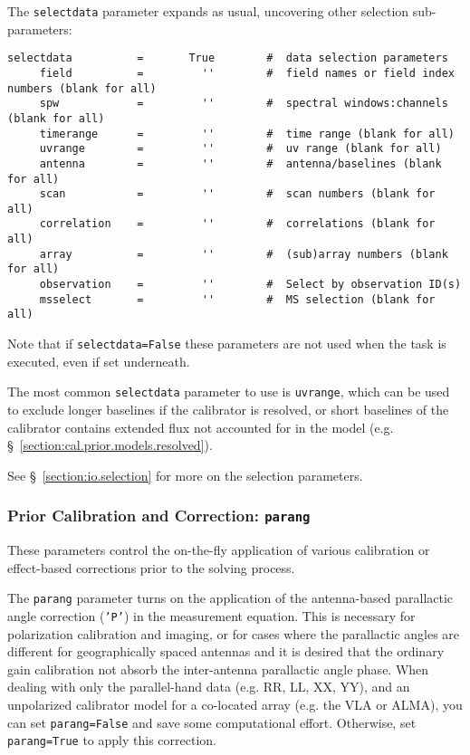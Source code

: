 The {\tt selectdata} parameter expands as usual, uncovering other
selection sub-parameters:
\small
\begin{verbatim}
selectdata          =       True        #  data selection parameters
     field          =         ''        #  field names or field index numbers (blank for all)
     spw            =         ''        #  spectral windows:channels (blank for all)
     timerange      =         ''        #  time range (blank for all)
     uvrange        =         ''        #  uv range (blank for all)
     antenna        =         ''        #  antenna/baselines (blank for all)
     scan           =         ''        #  scan numbers (blank for all)
     correlation    =         ''        #  correlations (blank for all)
     array          =         ''        #  (sub)array numbers (blank for all)
     observation    =         ''        #  Select by observation ID(s)
     msselect       =         ''        #  MS selection (blank for all)
\end{verbatim}
\normalsize
Note that if {\tt selectdata=False} these parameters are not used when
the task is executed, even if set underneath.

The most common {\tt selectdata} parameter to use is {\tt uvrange},
which can be used to exclude longer baselines if the calibrator is
resolved, or short baselines of the calibrator contains extended flux
not accounted for in the model 
(e.g. \S~\ref{section:cal.prior.models.resolved}).

See \S~\ref{section:io.selection} for more on the selection parameters.

\subsubsection{Prior Calibration and Correction: {\tt parang} }
\label{section:cal.solve.pars.prior}

These parameters control the on-the-fly application of various
calibration or effect-based corrections prior to the solving process.

The {\tt parang} parameter turns on the application of the
antenna-based parallactic angle correction ({\tt 'P'}) in the
measurement equation.  This is necessary for polarization calibration
and imaging, or for cases where the parallactic angles are different
for geographically spaced antennas and it is desired that the ordinary
gain calibration not absorb the inter-antenna parallactic angle phase.  
When dealing with only the parallel-hand data (e.g. RR, LL, XX, YY),
and an unpolarized calibrator model
for a co-located array (e.g. the VLA or ALMA), you can set {\tt  parang=False} 
and save some computational effort.  Otherwise, set {\tt parang=True} to apply
this correction.

